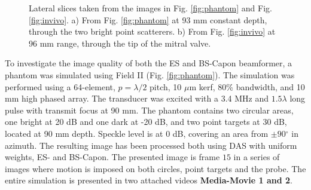\documentclass[journal]{IEEEtran}
\newcommand{\degree}{\ensuremath{^\circ}}
\newcommand\multimedia[1]{\textbf{{\color{red}#1}}}
\begin{document}
\begin{figure}[!t]
\centerline{
\hfil
{}
}
\caption{Lateral slices taken from the images in Fig. \ref{fig:phantom} and Fig. \ref{fig:invivo}. a) From Fig. \ref{fig:phantom} at 93 mm constant depth, through the two bright point scatterers. b) From Fig. \ref{fig:invivo} at 96 mm range, through the tip of the mitral valve.}
\label{fig:slices}
\end{figure}

To investigate the image quality of both the ES and BS-Capon beamformer, a phantom was simulated using Field II \cite{Jensen1992, Jensen1996a} (Fig. \ref{fig:phantom}). The simulation was performed using a 64-element, $p=\lambda/2$ pitch, 10 $\mu$m kerf, 80\% bandwidth, and 10 mm high phased array. The transducer was excited with a 3.4 MHz and $1.5\lambda$ long pulse with transmit focus at 90 mm. The phantom contains two circular areas, one bright at 20 dB and one dark at -20 dB, and two point targets at 30 dB, located at 90 mm depth. Speckle level is at 0 dB, covering an area from $\pm90\degree$ in azimuth. The resulting image has been processed both using DAS with uniform weights, ES- and BS-Capon. The presented image is frame $15$ in a series of images where motion is imposed on both circles, point targets and the probe. The entire simulation is presented in two attached videos \multimedia{Media-Movie 1 and 2}.
\end{document}
